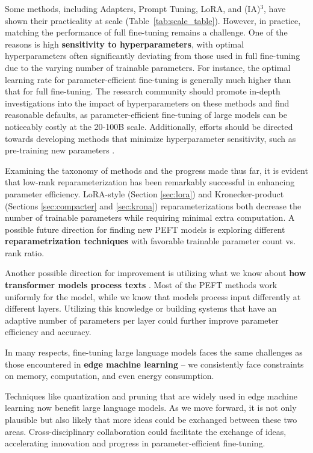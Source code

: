 Some methods, including Adapters, Prompt Tuning, LoRA, and (IA)$^3$, have shown their practicality at scale (Table~\ref{tab:scale_table}). However, in practice, matching the performance of full fine-tuning remains a challenge. One of the reasons is high \textbf{sensitivity to hyperparameters}, with optimal hyperparameters often significantly deviating from those used in full fine-tuning due to the varying number of trainable parameters. For instance, the optimal learning rate for parameter-efficient fine-tuning is generally much higher than that for full fine-tuning. The research community should promote in-depth investigations into the impact of hyperparameters on these methods and find reasonable defaults, as parameter-efficient fine-tuning of large models can be noticeably costly at the 20-100B scale. Additionally, efforts should be directed towards developing methods that minimize hyperparameter sensitivity, such as pre-training new parameters \citep{spot,prompt_mapping}.

Examining the taxonomy of methods and the progress made thus far, it is evident that low-rank reparameterization has been remarkably successful in enhancing parameter efficiency. LoRA-style (Section \ref{sec:lora}) and Kronecker-product (Sections \ref{sec:compacter} and \ref{sec:krona}) reparameterizations both decrease the number of trainable parameters while requiring minimal extra computation. A possible future direction for finding new PEFT models is exploring different \textbf{reparametrization techniques} with favorable trainable parameter count vs. rank ratio.

Another possible direction for improvement is utilizing what we know about \textbf{how transformer models process texts} \citep{rogers-etal-2020-primer}. Most of the PEFT methods work uniformly for the model, while we know that models process input differently at different layers. Utilizing this knowledge or building systems that have an adaptive number of parameters per layer could further improve parameter efficiency and accuracy.

In many respects, fine-tuning large language models faces the same challenges as those encountered in \textbf{edge machine learning} -- we consistently face constraints on memory, computation, and even energy consumption.

Techniques like quantization and pruning \citep{pmlr-v37-gupta15,optimal_brain_damage} that are widely used in edge machine learning now benefit large language models. As we move forward, it is not only plausible but also likely that more ideas could be exchanged between these two areas. Cross-disciplinary collaboration could facilitate the exchange of ideas, accelerating innovation and progress in parameter-efficient fine-tuning.


\vskip 0.2in


